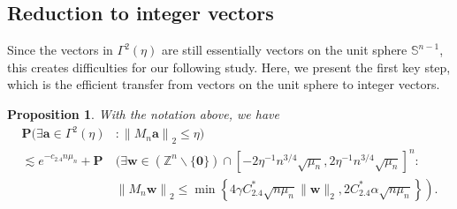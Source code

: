 \documentclass{article}
\numberwithin{equation}{section}
\theoremstyle{plain}
\newtheorem{proposition}{Proposition}[section]
\begin{document}
\subsection{Reduction to integer vectors}
Since the vectors in $\Gamma^2(\eta)$ are still essentially vectors on the unit sphere $\mathbb{S}^{n-1}$, this creates difficulties for our following study. Here, we present the first key step, which is the efficient transfer from vectors on the unit sphere to integer vectors.
\begin{proposition}\label{pro421}
With the notation above, we have
\begin{align*}
\textbf{P}(\exists \boldsymbol{a} \in \Gamma^2(\eta)&:\left\|M_n \boldsymbol{a}\right\|_2 \leq \eta) \\
\lesssim e^{{-c_{2.4}}n\mu_{n}}+\textbf{P}&(\exists \boldsymbol{w} \in\left(\mathbb{Z}^n\backslash\{\mathbf{0}\}\right)\cap\left[-2 \eta^{-1} n^{3 / 4}\sqrt{\mu_{n}}, 2 \eta^{-1} n^{3 / 4}\sqrt{\mu_{n}}\right]^n: \\
& \left.\left\|M_n \boldsymbol{w}\right\|_2 \leq \min \left\{4 \gamma C^*_{2.4} \sqrt{n\mu_{n}}\|\boldsymbol{w}\|_2, 2 C^*_{2.4} \alpha \sqrt{n\mu_{n}}\right\}\right).
\end{align*}
\end{proposition}
\end{document}
